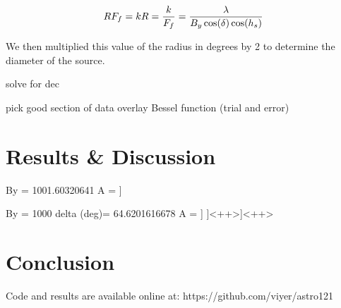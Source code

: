 \documentclass{article}
\begin{document}
  \[RF_{f}=k \\
      R = \frac{k}{F_{f}} = \frac{\lambda}{B_{y}\cos(\delta)\cos(h_{s})}
  \]

  We then multiplied this value of the radius in degrees by 2 to determine the
  diameter of the source.



  solve for dec

  pick good section of data
  overlay Bessel function (trial and error)


\section{Results \& Discussion}

By = 1001.60320641
A = \left[ -0.04549861]
 [ 0.00702375]]

By = 1000
delta (deg)= 64.6201616678
A = \left[ -0.06401115]
 [-0.00184063]]
 \right]<++>\right]<++>

\section{Conclusion}

Code and results are available online at: https://github.com/viyer/astro121

%   
%   
\end{document}
